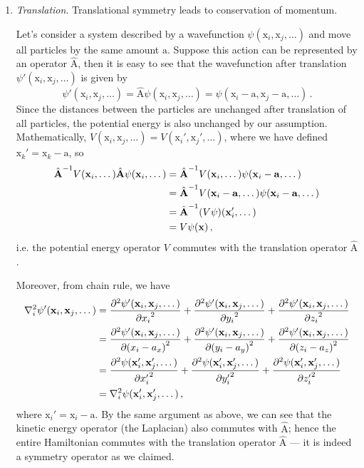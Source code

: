 \documentclass{article}
\theoremstyle{plain}\theoremheaderfont{\normalfont\itshape}\theorembodyfont{\rmfamily}\theoremseparator{.}\newtheorem*{rem}{Remark}\newtheorem*{ex}{Example}\newtheorem*{proof}{Proof}\newtheorem*{altp}{Alternative proof}
\theoremstyle{plain}\theoremheaderfont{\normalfont\bfseries}\theorembodyfont{\rmfamily}\theoremseparator{.}\newtheorem{thm}{Theorem}[section]\newtheorem{lem}[thm]{Lemma}\newtheorem{prop}[thm]{Proposition}\newtheorem*{cor}{Corollary}\newtheorem{defn}[thm]{Definition}\newtheorem{clm}[thm]{Claim}\newtheorem{clminproof}{Claim}\newtheorem*{law}{Law}\newtheorem{pos}[thm]{Postulate}
\theoremstyle{break}\theoremheaderfont{\normalfont\itshape}\theorembodyfont{\rmfamily}\theoremseparator{.\medskip}\newtheorem*{proofskip}{Proof}\newtheorem*{exs}{Examples}\newtheorem*{rems}{Remarks}
\theoremstyle{break}\theoremheaderfont{\normalfont\bfseries}\theorembodyfont{\rmfamily}\theoremseparator{.\medskip}\newtheorem{lemskip}[thm]{Lemma}\newtheorem{defnskip}[thm]{Definition}\newtheorem{propskip}[thm]{Proposition}\newtheorem{thmskip}[thm]{Theorem}
\numberwithin{equation}{section}
\newcommand{\pdv}[3][]{\frac{\partial^{#1} #2}{{\partial #3}^{#1}}}
\newcommand{\vb}[1]{\bm{\mathrm{#1}}}
\newcommand{\laplacian}{\nabla^2}
\begin{document}
    \begin{enumerate}[topsep=0pt,label=(\roman*)]
        \item \textit{Translation}. Translational symmetry leads to conservation of momentum.
        
        Let's consider a system described by a wavefunction \(\psi(\vb{x}_i,\vb{x}_j,\dots)\) and move all particles by the same amount \(\vb{a}\). Suppose this action can be represented by an operator \(\hat{\vb{A}}\), then it is easy to see that the wavefunction after translation \(\psi'(\vb{x}_i,\vb{x}_j,\dots)\) is given by
        \begin{equation}
            \psi'(\vb{x}_i,\vb{x}_j,\dots)=\hat{\vb{A}}\psi(\vb{x}_i,\vb{x}_j,\dots)=\psi(\vb{x}_i-\vb{a},\vb{x}_j-\vb{a},\dots)\,.
        \end{equation} 
        Since the distances between the particles are unchanged after translation of all particles, the potential energy is also unchanged by our assumption. Mathematically, \(V(\vb{x}_i,\vb{x}_j,\dots)=V(\vb{x}_i',\vb{x}_j',\dots)\), where we have defined \(\vb{x}_k'=\vb{x}_k-\vb{a}\), so
        \begin{align}
            \hat{\vb{A}}^{-1}V(\vb{x}_i,\dots)\hat{\vb{A}}\psi(\vb{x}_i,\dots)&=\hat{\vb{A}}^{-1}V(\vb{x}_i,\dots)\psi(\vb{x}_i-\vb{a},\dots)\notag\\
            &=\hat{\vb{A}}^{-1}V(\vb{x}_i-\vb{a},\dots)\psi(\vb{x}_i-\vb{a},\dots)\notag\\
            &=\hat{\vb{A}}^{-1}(V\psi)(\vb{x}_i',\dots)\notag\\
            &=V\psi(\vb{x})\,,
        \end{align}
        i.e. the potential energy operator \(V\) commutes with the translation operator \(\hat{\vb{A}}\).
        
        Moreover, from chain rule, we have
        \begin{align}
            \laplacian_i\psi'(\vb{x}_i,\vb{x}_j,\dots)&=\pdv[2]{\psi'(\vb{x}_i,\vb{x}_j,\dots)}{x_i}+\pdv[2]{\psi'(\vb{x}_i,\vb{x}_j,\dots)}{y_i}+\pdv[2]{\psi'(\vb{x}_i,\vb{x}_j,\dots)}{z_i}\notag\\
            &=\pdv[2]{\psi'(\vb{x}_i,\vb{x}_j,\dots)}{(x_i-a_x)}+\pdv[2]{\psi'(\vb{x}_i,\vb{x}_j,\dots)}{(y_i-a_y)}+\pdv[2]{\psi'(\vb{x}_i,\vb{x}_j,\dots)}{(z_i-a_z)}\notag\\
            &=\pdv[2]{\psi(\vb{x}_i',\vb{x}_j',\dots)}{x_i'}+\pdv[2]{\psi(\vb{x}_i',\vb{x}_j',\dots)}{y_i'}+\pdv[2]{\psi(\vb{x}_i',\vb{x}_j',\dots)}{z_i'}\notag\\
            &=\laplacian_i\psi(\vb{x}_i',\vb{x}_j',\dots)\,,
        \end{align}
        where \(\vb{x}_i'=\vb{x}_i-\vb{a}\). By the same argument as above, we can see that the kinetic energy operator (the Laplacian) also commutes with \(\hat{\vb{A}}\); hence the entire Hamiltonian commutes with the translation operator \(\hat{\vb{A}}\) --- it is indeed a symmetry operator as we claimed. 
        

\end{enumerate}
\end{document}
